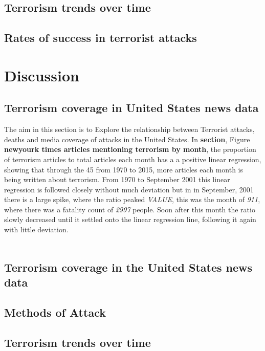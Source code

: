 \documentclass[10pt,a4paper]{article}
\begin{document}
\subsection{Terrorism trends over time}

\subsection{Rates of success in terrorist attacks}

	\section{Discussion} 

\subsection{Terrorism coverage in United States news data}
The aim in this section is to Explore the relationship between Terrorist attacks, deaths and media coverage of attacks in the United States. In \textbf{section}, Figure \textbf{newyourk times articles mentioning terrorism by month}, the proportion of terrorism articles to total articles each month has a a positive linear regression, showing that through the 45 from 1970 to 2015, more articles each month is being written about terrorism. From 1970 to September 2001 this linear regression is followed closely without much deviation but in in September, 2001 there is a large spike, where the ratio peaked \textit{VALUE}, this was the month of \textit{911}, where there was a fatality count of \textit{2997} people. Soon after this month the ratio slowly decreased until it settled onto the linear regression line, following it again with little deviation. 
\\\\

\subsection{Terrorism coverage in the United States news data}


\subsection{Methods of Attack}

\subsection{Terrorism trends over time}
\end{document}
